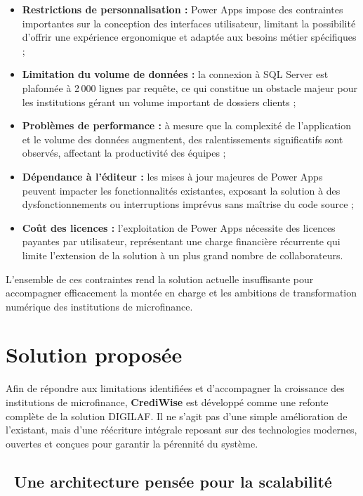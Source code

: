 \begin{itemize}
    \item \textbf{Restrictions de personnalisation :} Power Apps impose des contraintes
    importantes sur la conception des interfaces utilisateur, limitant la possibilité
    d'offrir une expérience ergonomique et adaptée aux besoins métier spécifiques ;
    \item \textbf{Limitation du volume de données :} la connexion à SQL Server est
    plafonnée à 2\,000 lignes par requête, ce qui constitue un obstacle majeur pour les
    institutions gérant un volume important de dossiers clients ;
    \item \textbf{Problèmes de performance :} à mesure que la complexité de l'application
    et le volume des données augmentent, des ralentissements significatifs sont observés,
    affectant la productivité des équipes ;
    \item \textbf{Dépendance à l'éditeur :} les mises à jour majeures de Power Apps peuvent
    impacter les fonctionnalités existantes, exposant la solution à des dysfonctionnements
    ou interruptions imprévus sans maîtrise du code source ;
    \item \textbf{Coût des licences :} l'exploitation de Power Apps nécessite des licences
    payantes par utilisateur, représentant une charge financière récurrente qui limite
    l'extension de la solution à un plus grand nombre de collaborateurs.
\end{itemize}

L'ensemble de ces contraintes rend la solution actuelle insuffisante pour accompagner
efficacement la montée en charge et les ambitions de transformation numérique des
institutions de microfinance.

\section{Solution proposée}

Afin de répondre aux limitations identifiées et d'accompagner la croissance des institutions
de microfinance, \textbf{CrediWise} est développé comme une refonte complète de la solution
DIGILAF. Il ne s'agit pas d'une simple amélioration de l'existant, mais d'une réécriture
intégrale reposant sur des technologies modernes, ouvertes et conçues pour garantir la
pérennité du système.

\subsection*{~Une architecture pensée pour la scalabilité}

